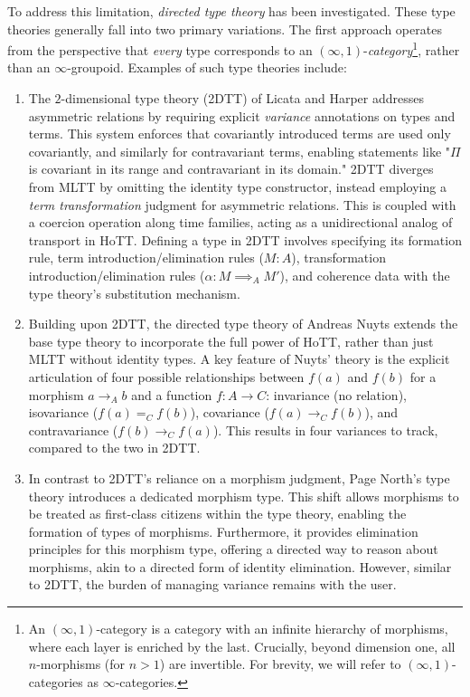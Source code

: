 \documentclass[main.tex]{subfiles}
\begin{document}
To address this limitation, \textit{directed type theory} has been investigated. These type theories generally fall into two primary variations. The first approach operates from the perspective that \textit{every} type corresponds to an $(\infty,1)$-\textit{category}\footnote{An $(\infty,1)$-category is a category with an infinite hierarchy of morphisms, where each layer is enriched by the last. Crucially, beyond dimension one, all $n$-morphisms (for $n > 1$) are invertible. For brevity, we will refer to $(\infty,1)$-categories as $\infty$-categories.}, rather than an $\infty$-groupoid. Examples of such type theories include:

\begin{enumerate}
	\item The $2$-dimensional type theory (2DTT) of Licata and Harper \cite{daniel_r_licata_2-dimensional_2011} addresses asymmetric relations by requiring explicit \textit{variance} annotations on types and terms. This system enforces that covariantly introduced terms are used only covariantly, and similarly for contravariant terms, enabling statements like "$\Pi$ is covariant in its range and contravariant in its domain."  2DTT diverges from MLTT by omitting the identity type constructor, instead employing a \textit{term transformation} judgment for asymmetric relations. This is coupled with a coercion operation along time families, acting as a unidirectional analog of transport in HoTT. Defining a type in 2DTT involves specifying its formation rule, term introduction/elimination rules ($M:A$), transformation introduction/elimination rules ($\alpha : M \implies_A M'$), and coherence data with the type theory's substitution mechanism.
	\item Building upon 2DTT, the directed type theory of Andreas Nuyts \cite{nuyts2015towards} extends the base type theory to incorporate the full power of HoTT, rather than just MLTT without identity types. A key feature of Nuyts' theory is the explicit articulation of four possible relationships between $f(a)$ and $f(b)$ for a morphism $a \to_A b$ and a function $f : A \to C$: invariance (no relation), isovariance ($f(a) =_C f(b)$), covariance ($f(a) \to_C f(b)$), and contravariance ($f(b) \to_C f(a)$). This results in four variances to track, compared to the two in 2DTT.
	\item In contrast to 2DTT's reliance on a morphism judgment, Page North's type theory \cite{north_towards_2019} introduces a dedicated morphism type. This shift allows morphisms to be treated as first-class citizens within the type theory, enabling the formation of types of morphisms. Furthermore, it provides elimination principles for this morphism type, offering a directed way to reason about morphisms, akin to a directed form of identity elimination. However, similar to 2DTT, the burden of managing variance remains with the user.
  \end{enumerate}
\end{document}
